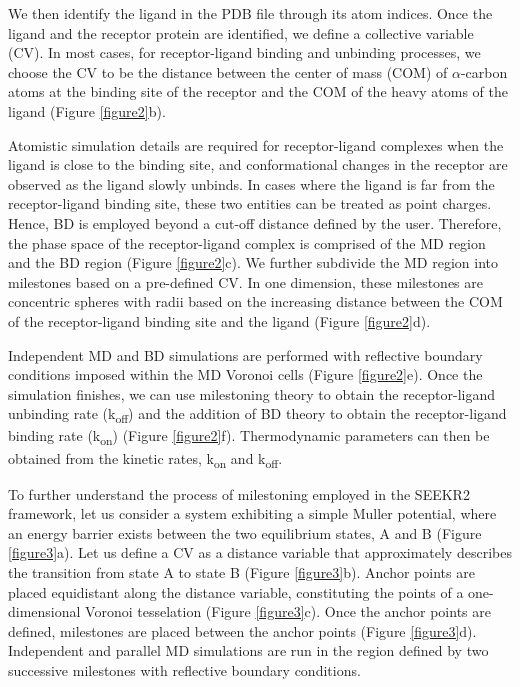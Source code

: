 \documentclass[9pt,training,pubversion]{livecoms}
\begin{document}
\noindent We then identify the ligand in the PDB file through its atom indices. Once the ligand and the receptor protein are identified, we define a collective variable (CV). In most cases, for receptor-ligand binding and unbinding processes, we choose the CV to be the distance between the center of mass (COM) of $\alpha$-carbon atoms at the binding site of the receptor and the COM of the heavy atoms of the ligand (Figure \ref{figure2}b). \par

\noindent Atomistic simulation details are required for receptor-ligand complexes when the ligand is close to the binding site, and conformational changes in the receptor are observed as the ligand slowly unbinds. In cases where the ligand is far from the receptor-ligand binding site, these two entities can be treated as point charges. Hence, BD is employed beyond a cut-off distance defined by the user.  Therefore, the phase space of the receptor-ligand complex is comprised of the MD region and the BD region (Figure \ref{figure2}c). We further subdivide the MD region into milestones based on a pre-defined CV. In one dimension, these milestones are concentric spheres with radii based on the increasing distance between the COM of the receptor-ligand binding site and the ligand (Figure \ref{figure2}d). \par

\noindent Independent MD and BD simulations are performed with reflective boundary conditions imposed within the MD Voronoi cells (Figure \ref{figure2}e). Once the simulation finishes, we can use milestoning theory to obtain the receptor-ligand unbinding rate (k\textsubscript{off}) and the addition of BD theory to obtain the receptor-ligand binding rate (k\textsubscript{on}) (Figure \ref{figure2}f). Thermodynamic parameters can then be obtained from the kinetic rates, k\textsubscript{on} and k\textsubscript{off}. \par 

\noindent To further understand the process of milestoning employed in the SEEKR2 framework, let us consider a system exhibiting a simple Muller potential, where an energy barrier exists between the two equilibrium states, A and B (Figure \ref{figure3}a). Let us define a CV as a distance variable that approximately describes the transition from state A to state B (Figure \ref{figure3}b). Anchor points are placed equidistant along the distance variable, constituting the points of a one-dimensional Voronoi tesselation (Figure \ref{figure3}c). Once the anchor points are defined, milestones are placed between the anchor points (Figure \ref{figure3}d). Independent and parallel MD simulations are run in the region defined by two successive milestones with reflective boundary conditions. \par
\end{document}
